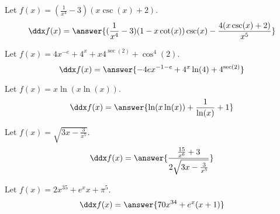 \documentclass{ximera}
\begin{document}
\begin{shuffle}
\begin{exercise}
Let $f(x)=(\frac{1}{x^4}-3) (x \csc (x)+2)$.
\[
\ddx f(x) = \answer{(\frac{1}{x^4}-3) (1-x \cot (x)) \csc (x)-\frac{4 (x \csc (x)+2)}{x^5}}
\]
\end{exercise}

\begin{exercise}
Let $f(x)=4 x^{-e}+4^x+x 4^{\sec (2)}+\cos ^4(2)$.
\[
\ddx f(x) = \answer{-4 e x^{-1-e}+4^x \ln (4)+4^{\sec (2)}}
\]
\end{exercise}



\begin{exercise}
Let $f(x)=x \ln (x \ln (x))$.
\[
\ddx f(x) = \answer{\ln (x \ln (x))+\frac{1}{\ln (x)}+1}
\]
\end{exercise}

\begin{exercise}
Let $f(x)=\sqrt{3 x-\frac{3}{x^5}}$.
\[
\ddx f(x) = \answer{\frac{\frac{15}{x^6}+3}{2 \sqrt{3 x-\frac{3}{x^5}}}}
\]
\end{exercise}

\begin{exercise}
Let $f(x)=2 x^{35}+e^x x+\pi ^5$.
\[
\ddx f(x) = \answer{70 x^{34}+e^x (x+1)}
\]
\end{exercise}




\end{shuffle}
\end{document}
